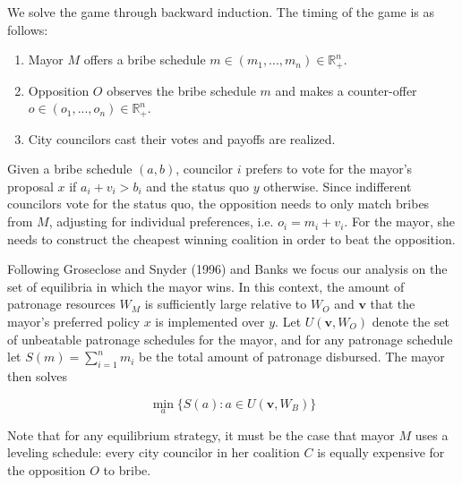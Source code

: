 \documentclass[12pt,a4paper]{article}
\newcommand{\real}{\mathbb{R}_+^n}
\newcommand{\bfv}{\mathbf{v}}
\begin{document}
We solve the game through backward induction. The timing of the game is as follows:

\begin{enumerate}
    \item Mayor $M$ offers a bribe schedule $m \in (m_1, ..., m_n) \in \real$.
    \item Opposition $O$ observes the bribe schedule $m$ and makes a counter-offer $o \in (o_1, ..., o_n) \in \real$.
    \item City councilors cast their votes and payoffs are realized.
\end{enumerate}

Given a bribe schedule $(a, b)$, councilor $i$ prefers to vote for the mayor's proposal $x$ if $a_i + v_i > b_i$ and the status quo $y$ otherwise. Since indifferent councilors vote for the status quo, the opposition needs to only match bribes from $M$, adjusting for individual preferences, i.e. $o_i = m_i + v_i$. For the mayor, she needs to construct the cheapest winning coalition in order to beat the opposition. 

Following Groseclose and Snyder (1996) and Banks we focus our analysis on the set of equilibria in which the mayor wins. In this context, the amount of patronage resources $W_M$ is sufficiently large relative to $W_O$ and $\bfv$ that the mayor's preferred policy $x$ is implemented over $y$. Let $U(\bfv, W_O)$ denote the set of unbeatable patronage schedules for the mayor, and for any patronage schedule let $S(m) = \sum_{i = 1}^n m_i$ be the total amount of patronage disbursed. The mayor then solves

\begin{equation}
    \label{eqn:solution}
    \min_a\{S(a) : a \in U(\mathbf{v}, W_B) \}
\end{equation}

Note that for any equilibrium strategy, it must be the case that mayor $M$ uses a leveling schedule: every city councilor in her coalition $C$ is equally expensive for the opposition $O$ to bribe.
\end{document}
